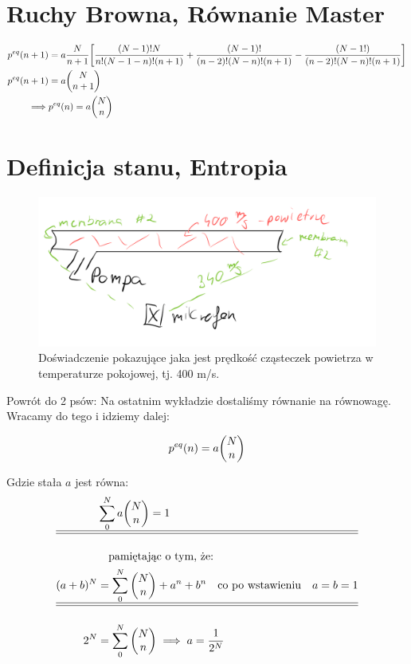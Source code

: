 \documentclass[12pt,a4paper]{report}
\newenvironment{lecture}[1]{\par\medskip
   \noindent\chapter{#1} \rmfamily}{\medskip}
\begin{document}
\begin{lecture}{Ruchy Browna, Równanie Master}
\begin{align*}
    p^{eq}(n+1) &= a \frac{N}{n +1} \qty[\frac{(N-1)! N }{n! (N-1-n)! (n+1)} + \frac{(N-1)!}{(n-2)!(N-n)!(n+1)} - \frac{(N-1!)}{(n-2)!(N-n)! (n+1)}]\\
    p^{eq}(n+1) &= a\mqty(N \\ n+1)\\
    \implies& p^{eq}(n) = a \mqty(N \\n)
\end{align*}

\end{lecture}


\begin{lecture}{Definicja stanu, Entropia}

\begin{figure}[!ht]
    \centering
    \includegraphics[width=0.8\linewidth, angle=0]{Wyk_3_Rys_1.jpeg}
    \caption{Doświadczenie pokazujące jaka jest prędkość cząsteczek powietrza w temperaturze pokojowej, tj. 400 m/s.}
    \label{fig:lec_3:v_pow}
\end{figure}

Powrót do 2 psów:
Na ostatnim wykładzie dostaliśmy równanie na równowagę. Wracamy do tego i idziemy dalej:

\[ p^{eq}(n) = a \mqty(N \\n) \]

Gdzie stała $a$ jest równa:
\begin{align*}
    &\sum_0^N a \mqty(N \\ n) = 1\\
    \hline \hline \\
    &\qq{pamiętając o tym, że:}\\
    (a+b)^N &= \sum_0^N \mqty(N \\ n) + a^n + b^n \qq{co po wstawieniu}  a = b =1\\
    \hline \hline \\
    2^N &= \sum_0^N \mqty(N \\ n) \implies a = \frac{1}{2^N}
\end{align*}




\end{lecture}
\end{document}
